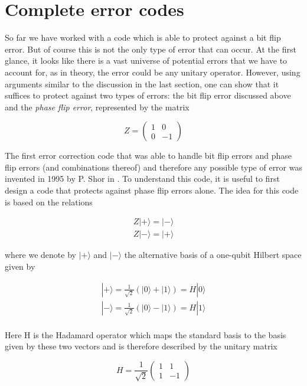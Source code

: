 \documentclass[a4paper, draft]{article}
\theoremstyle{own}
\theoremstyle{remark}
\begin{document}
\section{Complete error codes}

So far we have worked with a code which is able to protect against a bit flip error. But of course this is not the only type of error that can occur. At the first glance, it looks like there is a vast universe of potential errors that we have to account for, as in theory, the error could be any unitary operator. However, using arguments similar to the discussion in the last section, one can show that it suffices to protect against two types of errors: the bit flip error discussed above and the \emph{phase flip error}, represented by the matrix

$$
Z = \begin{pmatrix} 1 & 0 \\ 0 & -1 \end{pmatrix}
$$

The first error correction code that was able to handle bit flip errors and phase flip errors (and combinations thereof) and therefore any possible type of error was invented in 1995 by P. Shor in \cite{Shor}. To understand this code, it is useful to first design a code that protects against phase flip errors alone. The idea for this code is based on the relations

\begin{align*}
Z|+\rangle = |- \rangle \\
Z|-\rangle  = |+ \rangle
\end{align*}

where we denote by $|+\rangle $ and $|- \rangle$ the alternative basis of a one-qubit Hilbert space given by 

\begin{align*}
|+\rangle = \frac{1}{\sqrt{2}} (|0 \rangle + |1 \rangle) = H |0\rangle \\
|-\rangle = \frac{1}{\sqrt{2}} (|0 \rangle - |1 \rangle) = H |1\rangle \\
\end{align*}

Here H is the Hadamard operator which maps the standard basis to the basis given by these two vectors and is therefore described by the unitary matrix

$$
H = \frac{1}{\sqrt{2}} \begin{pmatrix}1 & 1 \\ 1 & -1 \end{pmatrix}
$$
\end{document}
